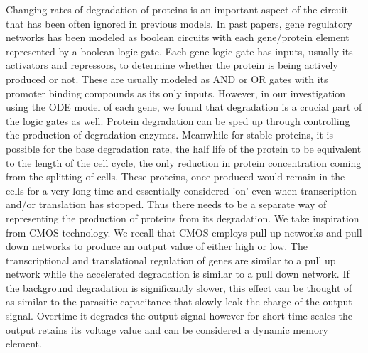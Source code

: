 \documentclass{article}
\begin{document}
\newline \newline
Changing rates of degradation of proteins is an important aspect of the circuit that has been often ignored in previous models.  In past papers, gene regulatory networks has been modeled as boolean circuits with each gene/protein element represented by a boolean logic gate.  Each gene logic gate has inputs, usually its activators and repressors, to determine whether the protein is being actively produced or not.  These are usually modeled as AND or OR gates with its promoter binding compounds as its only inputs.  However, in our investigation using the ODE model of each gene, we found that degradation is a crucial part of the logic gates as well.  Protein degradation can be sped up through controlling the production of degradation enzymes.  Meanwhile for stable proteins, it is possible for the base degradation rate, the half life of the protein to be equivalent to the length of the cell cycle, the only reduction in protein concentration coming from the splitting of cells.  These proteins, once produced would remain in the cells for a very long time and essentially considered 'on' even when transcription and/or translation has stopped.  Thus there needs to be a separate way of representing the production of proteins from its degradation.  We take inspiration from CMOS technology.  We recall that CMOS employs pull up networks and pull down networks to produce an output value of either high or low.  The transcriptional and translational regulation of genes are similar to a pull up network while the accelerated degradation is similar to a pull down network.  If the background degradation is significantly slower, this effect can be thought of as similar to the parasitic capacitance that slowly leak the charge of the output signal.  Overtime it degrades the output signal however for short time scales the output retains its voltage value and can be considered a dynamic memory element. 
\end{document}

